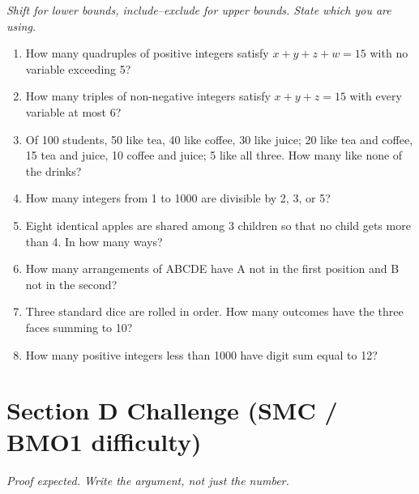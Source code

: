 \documentclass[11pt,a4paper]{article}
\begin{document}
\noindent\textit{Shift for lower bounds, include--exclude for upper bounds. State which you are using.}

\begin{enumerate}

\item How many quadruples of positive integers satisfy $x+y+z+w=15$ with no variable exceeding 5?

\item How many triples of non-negative integers satisfy $x+y+z=15$ with every variable at most 6?

\item Of 100 students, 50 like tea, 40 like coffee, 30 like juice; 20 like tea and coffee, 15 tea and juice, 10 coffee and juice; 5 like all three. How many like none of the drinks?

\item How many integers from 1 to 1000 are divisible by 2, 3, or 5?

\item Eight identical apples are shared among 3 children so that no child gets more than 4. In how many ways?

\item How many arrangements of ABCDE have A not in the first position and B not in the second?

\item Three standard dice are rolled in order. How many outcomes have the three faces summing to 10?

\item How many positive integers less than 1000 have digit sum equal to 12?

\end{enumerate}

\section*{Section D \quad Challenge \hfill{\normalfont\small(SMC / BMO1 difficulty)}}

\noindent\textit{Proof expected. Write the argument, not just the number.}
\end{document}

